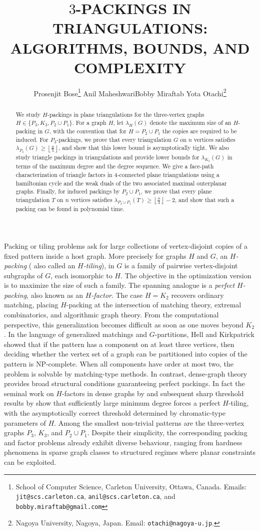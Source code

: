 \documentclass{patmorin}
\title{\MakeUppercase{$3$-packings in Triangulations: Algorithms, bounds, and Complexity}}
\author{
Prosenjit Bose\thanks{School of Computer Science, Carleton University, Ottawa, Canada. Emails: {\tt jit@scs.carleton.ca},  {\tt anil@scs.carleton.ca}, and {\tt bobby.miraftab@gmail.com}}
\;\;\;\;\;\;Anil Maheshwari\footnotemark[1]\;\;\;\;\;\;Bobby Miraftab\footnotemark[1]\;\;\;\;\;\;
Yota Otachi\thanks{Nagoya University, Nagoya, Japan. Email: {\tt otachi@nagoya-u.jp}.}
}
\newcommand{\defin}[1]{\emph{\textcolor{brightmaroon}{#1}}}
\begin{document}
\maketitle

\begin{abstract}
We study $H$-packings in plane triangulations for the three-vertex graphs
$H\in\{P_3,K_3,P_2\cup P_1\}$. For a graph $H$, let $\lambda_H(G)$ denote
the maximum size of an $H$-packing in $G$, with the convention that for
$H=P_2\cup P_1$ the copies are required to be induced. For $P_3$-packings,
we prove that every triangulation $G$ on $n$ vertices satisfies
$\lambda_{P_3}(G)\ge \left\lfloor \frac n5\right\rfloor$,
and show that this lower bound is asymptotically tight. 
We also study
triangle packings in triangulations and provide lower bounds for
$\lambda_{K_3}(G)$ in terms of the maximum degree and the degree sequence.
We give a face-path characterization of triangle factors in $4$-connected
plane triangulations using a hamiltonian cycle and the weak duals of the two
associated maximal outerplanar graphs. Finally, for induced packings by
$P_2\cup P_1$, we prove that every plane triangulation $T$ on $n$ vertices
satisfies $\lambda_{P_2\cup P_1}(T)\ge
\left\lfloor \frac n3\right\rfloor-2$,
and show that such a packing can be found in polynomial time.
\end{abstract}


Packing or tiling problems ask for large collections of vertex-disjoint copies of a fixed pattern inside a host graph. 
More precisely for graphs $H$ and $G$, an \defin{$H$-packing} ( also called an \defin{$H$-tiling}), in $G$ is a family of pairwise vertex-disjoint subgraphs of $G$, each isomorphic to $H$. 
The objective in the optimization version is to maximize the size of such a family. The spanning analogue is a \defin{perfect $H$-packing}, also known as an \defin{$H$-factor}.
The case $H=K_2$ recovers ordinary matching, placing $H$-packing at the intersection of matching theory, extremal combinatorics, and algorithmic graph theory. From the computational perspective, this generalization becomes difficult as soon as one moves beyond $K_2$. In the language of generalized matchings and $G$-partitions, Hell and Kirkpatrick \cite{HellKirkpatrick1981,KirkpatrickHell1983} showed that if the pattern has a component on at least three vertices, then deciding whether the vertex set of a graph can be partitioned into copies of the pattern is NP-complete.
When all components have order at most two, the problem is solvable by matching-type methods. In contrast, dense-graph theory provides broad structural conditions guaranteeing perfect packings.
In fact the seminal work on $H$-factors in dense graphs by \citet{alon1996h} and subsequent sharp threshold results by \citet{KuhnOsthus2009} show that sufficiently large minimum degree forces a perfect $H$-tiling, with the asymptotically correct threshold determined by chromatic-type parameters of $H$.
Among the smallest non-trivial patterns are the three-vertex graphs $P_3$, $K_3$, and $P_2\cup P_1$. Despite their simplicity, the corresponding packing and factor problems already exhibit diverse behaviour, ranging from hardness phenomena in sparse graph classes to structured regimes where planar constraints can be exploited.
\end{document}
